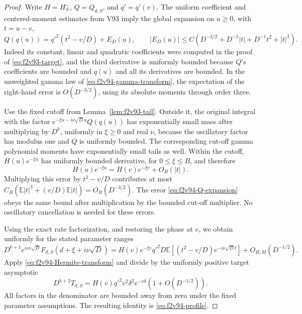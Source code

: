 \documentclass[11pt]{article}
\theoremstyle{definition}
\theoremstyle{remark}
\begin{document}
\begin{proof}
Write \(H=H_S^-\), \(Q=Q_{d,S}\), and \(q'=q'(v)\).
The uniform coefficient and centered-moment estimates from V93 imply
the global expansion on \(u\ge0\), with \(t=u-v\),
\begin{equation}
 Q(q(u))=q'^2(t^2-v/D)+E_D(u),
 \qquad
 |E_D(u)|\le C\left(D^{-3/2}+D^{-1}|t|
                         +D^{-1}t^2+|t|^3\right).
 \label{eq:f2v94-Q-expansion}
\end{equation}
Indeed its constant, linear and quadratic coefficients were computed
in the proof of \eqref{eq:f2v93-target}, and the third derivative is
uniformly bounded because \(Q\)'s coefficients are bounded and
\(q(u)\) and all its derivatives are bounded.  In the unweighted
gamma law of \eqref{eq:f2v94-gamma-transform}, the expectation of
the right-hand error is \(O(D^{-3/2})\), using its absolute moments
through order three.

Use the fixed cutoff from Lemma~\ref{lem:f2v93-tail}.  Outside it,
the original integral with the factor
\(e^{-\xi u-i\nu\sqrt D u}Q(q(u))\) has exponentially small
mass after multiplying by \(D^k\), uniformly in \(\xi\ge0\)
and real \(\nu\), because the oscillatory factor has modulus one
and \(Q\) is uniformly bounded.  The corresponding cut-off gamma
polynomial moments have exponentially small tails as well.
Within the cutoff, \(H(u)e^{-\xi u}\) has uniformly bounded
derivative, for \(0\le\xi\le B\), and therefore
\[
 H(u)e^{-\xi u}=H(v)e^{-\xi v}+O_B(|t|).
\]
Multiplying this error by \(t^2-v/D\) contributes at most
\(C_B(\mathbb E|t|^3+(v/D)\mathbb E|t|)=O_B(D^{-3/2})\).
The error \eqref{eq:f2v94-Q-expansion} obeys the same bound after
multiplication by the bounded cut-off multiplier.  No oscillatory
cancellation is needed for these errors.

Using the exact rate factorization, and restoring the phase at \(v\),
we obtain uniformly for the stated parameter ranges
\[
 D^{k+1}e^{i\nu v\sqrt D}
 F_{d,S}(d+\xi+i\nu\sqrt D)
 =H(v)e^{-\xi v}q'^2
       D\mathbb E[(t^2-v/D)e^{-i\nu\sqrt D t}]
       +O_{B,M}(D^{-1/2}).
\]
Apply \eqref{eq:f2v94-Hermite-transform} and divide by the uniformly
positive target asymptotic
\[
 D^{k+2}T_{d,S}=H(v)q'^2v^2\delta^2e^{-v\delta}
                       (1+O(D^{-1/2})).
\]
All factors in the denominator are bounded away from zero under the
fixed parameter assumptions.  The resulting identity is
\eqref{eq:f2v94-profile}.
\end{proof}
\end{document}
